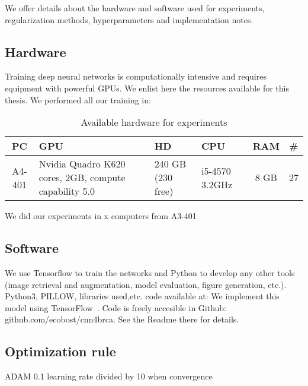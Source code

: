 We offer details about the hardware and software used for experiments, regularization methods, hyperparameters and implementation notes.

\subsection{Hardware}
Training deep neural networks is computationally intensive and requires equipment with powerful GPUs. We enlist here the resources available for this thesis.
We performed all our training in:
\begin{table}[h]
	\centering
	\begin{tabular}{cp{3.8cm}p{1.7cm}p{1.8cm}cc}
	\hline
	\textbf{PC}	& \textbf{GPU}	& \textbf{HD}	& \textbf{CPU}	& \textbf{RAM}	& \textbf{\#} \\
	\hline
	A4-401	& Nvidia Quadro K620 \newline 384 cores, 2GB, compute capability 5.0 & 240 GB \newline (230 free)	& i5-4570 \newline 3.2GHz	& 8 GB	& 27\\
	\hline
	\end{tabular}
	\caption{Available hardware for experiments}
\end{table}
We did our experiments in x computers from A3-401

\subsection{Software}
We use Tensorflow to train the networks and Python to develop any other tools (image retrieval and augmentation, model evaluation, figure generation, etc.).
Python3, PILLOW, libraries used,etc.
code available at:
We implement this model using TensorFlow~\cite{Abadi2015}. Code is freely accesible in Github: github.com/ecobost/cnn4brca. See the Readme there for details.

\subsection{Optimization rule}
ADAM
0.1 learning rate divided by 10 when convergence


